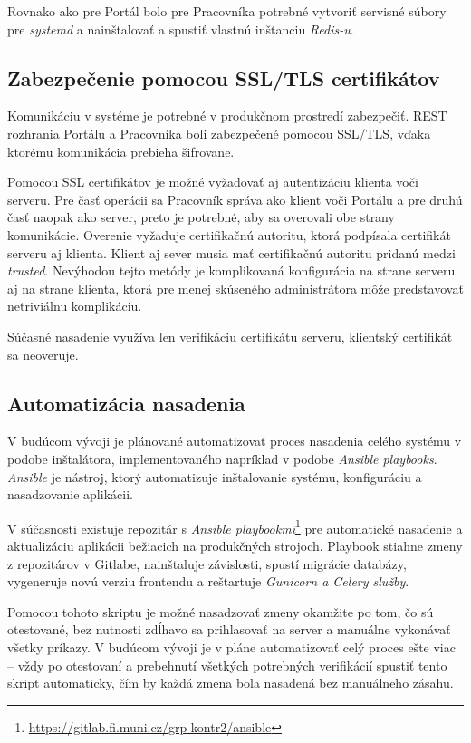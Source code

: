 \documentclass[
  digital, %
  twoside, %
  table,   %
  lof,     %
  lot,     %
]{fithesis3}
\begin{document}
Rovnako ako pre Portál bolo pre Pracovníka potrebné vytvoriť servisné súbory pre \emph{systemd} a nainštalovať a spustiť vlastnú inštanciu \emph{Redis-u}.

\subsection{Zabezpečenie pomocou SSL/TLS certifikátov}

Komunikáciu v systéme je potrebné v produkčnom prostredí zabezpečiť. REST rozhrania Portálu a Pracovníka boli zabezpečené pomocou SSL/TLS, vďaka ktorému komunikácia prebieha šifrovane. 

Pomocou SSL certifikátov je možné vyžadovať aj autentizáciu klienta voči serveru.
Pre časť operácii sa Pracovník správa ako klient voči Portálu a pre druhú časť naopak ako server, preto je potrebné, aby sa overovali obe strany komunikácie. Overenie vyžaduje certifikačnú autoritu, ktorá podpísala certifikát serveru aj klienta\cite{RFC2818}. Klient aj sever musia mať certifikačnú autoritu pridanú medzi \emph{trusted}. Nevýhodou tejto metódy je komplikovaná konfigurácia na strane serveru aj na strane klienta, ktorá pre menej skúseného administrátora môže predstavovať netriviálnu komplikáciu.

Súčasné nasadenie využíva len verifikáciu certifikátu serveru, klientský certifikát sa neoveruje.

\subsection{Automatizácia nasadenia}

V budúcom vývoji je plánované automatizovať proces nasadenia celého systému v podobe inštalátora, implementovaného napríklad v podobe \emph{Ansible playbooks}. \emph{Ansible} je nástroj, ktorý automatizuje inštalovanie systému, konfiguráciu a nasadzovanie aplikácii\cite{ansible}. 

V súčasnosti existuje repozitár s \emph{Ansible playbookmi}\footnote{\url{https://gitlab.fi.muni.cz/grp-kontr2/ansible}} pre automatické nasadenie a aktualizáciu aplikácii bežiacich na produkčných strojoch. Playbook stiahne zmeny z repozitárov v Gitlabe, nainštaluje závislosti, spustí migrácie databázy, vygeneruje novú verziu frontendu a reštartuje \emph{Gunicorn a Celery služby}.

Pomocou tohoto skriptu je možné nasadzovať zmeny okamžite po tom, čo sú otestované, bez nutnosti zdĺhavo sa prihlasovať na server a manuálne vykonávať všetky príkazy. V budúcom vývoji je v pláne automatizovať celý proces ešte viac -- vždy po otestovaní a prebehnutí všetkých potrebných verifikácií spustiť tento skript automaticky, čím by každá zmena bola nasadená bez manuálneho zásahu.
\end{document}
